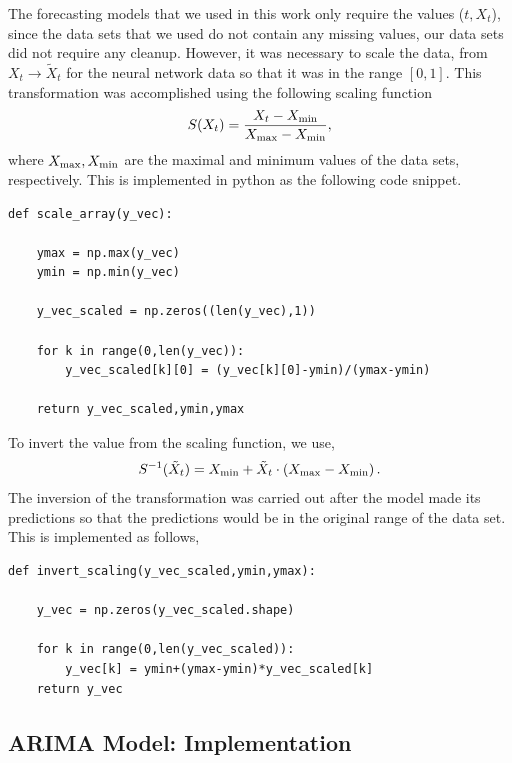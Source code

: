 \documentclass[10pt,a4paper]{article}
\begin{document}
The forecasting models that we used in this work only require the values ($t,X_t$), since the data sets that we used do not contain any missing values, our data sets did not require any cleanup. However, it was necessary to scale the data, from $X_t \rightarrow \tilde{X}_t$ for the neural network data so that it was in the range $[0,1]$. This transformation was accomplished using the following scaling function
\begin{equation}
S(X_t) = \frac{ X_t - X_{\rm min}}{X_{\rm max} - X_{\rm min}},
\end{equation} 
where $X_{\rm max}, X_{\rm min}$ are the maximal and minimum values of the data sets, respectively. This is implemented in python as the following code snippet.
\begin{lstlisting}
def scale_array(y_vec):
    
    ymax = np.max(y_vec)
    ymin = np.min(y_vec)
    
    y_vec_scaled = np.zeros((len(y_vec),1))
    
    for k in range(0,len(y_vec)):
        y_vec_scaled[k][0] = (y_vec[k][0]-ymin)/(ymax-ymin)
    
    return y_vec_scaled,ymin,ymax
\end{lstlisting}

To invert the value from the scaling function, we use,
\begin{equation}
S^{-1}(\tilde{X}_t) = X_{\rm min} + \tilde{X}_t\cdot \left(X_{\rm max} - X_{\rm min} \right).
\end{equation}
The inversion of the transformation was carried out after the model made its predictions so that the predictions would be in the original range of the data set. This is implemented as follows,
\begin{lstlisting}
def invert_scaling(y_vec_scaled,ymin,ymax):
    
    y_vec = np.zeros(y_vec_scaled.shape)
        
    for k in range(0,len(y_vec_scaled)):
        y_vec[k] = ymin+(ymax-ymin)*y_vec_scaled[k]
    return y_vec
\end{lstlisting}

\subsection{ARIMA Model: Implementation}\label{section: Fitting ARIMA}
\end{document}
